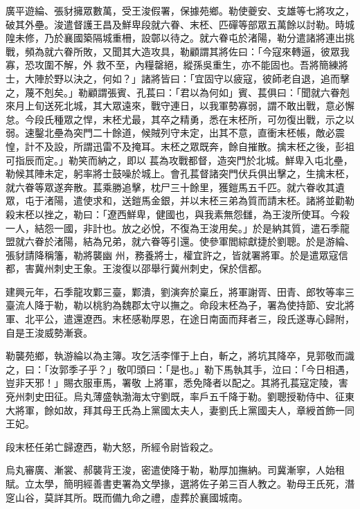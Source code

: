 \begin{pinyinscope}
 廣平遊綸、張豺擁眾數萬，受王浚假署，保據苑鄉。勒使夔安、支雄等七將攻之，破其外壘。浚遣督護王昌及鮮卑段就六眷、末柸、匹磾等部眾五萬餘以討勒。時城隍未修，乃於襄國築隔城重柵，設鄣以待之。就六眷屯於渚陽，勒分遣諸將連出挑戰，頻為就六眷所敗，又聞其大造攻具，勒顧謂其將佐曰：「今寇來轉逼，彼眾我寡，恐攻圍不解，外
 救不至，內糧罄絕，縱孫吳重生，亦不能固也。吾將簡練將士，大陣於野以決之，何如？」諸將皆曰：「宜固守以疲寇，彼師老自退，追而擊之，蔑不剋矣。」勒顧謂張賓、孔萇曰：「君以為何如」賓、萇俱曰：「聞就六眷剋來月上旬送死北城，其大眾遠來，戰守連日，以我軍勢寡弱，謂不敢出戰，意必懈怠。今段氏種眾之悍，末柸尤最，其卒之精勇，悉在末柸所，可勿復出戰，示之以弱。速鑿北壘為突門二十餘道，候賊列守未定，出其不意，直衝末柸帳，敵必震惶，計不及設，所謂迅雷不及掩耳。末柸之眾既奔，餘自摧散。擒末柸之後，彭祖可指辰而定。」勒笑而納之，即以
 萇為攻戰都督，造突門於北城。鮮卑入屯北壘，勒候其陣未定，躬率將士鼓噪於城上。會孔萇督諸突門伏兵俱出擊之，生擒末柸，就六眷等眾遂奔散。萇乘勝追擊，枕尸三十餘里，獲鎧馬五千匹。就六眷收其遺眾，屯于渚陽，遣使求和，送鎧馬金銀，并以末柸三弟為質而請末柸。諸將並勸勒殺末柸以挫之，勒曰：「遼西鮮卑，健國也，與我素無怨讎，為王浚所使耳。今殺一人，結怨一國，非計也。放之必悅，不復為王浚用矣。」於是納其質，遣石季龍盟就六眷於渚陽，結為兄弟，就六眷等引還。使參軍閻綜獻捷於劉聰。於是游綸、張豺請降稱籓，勒將襲幽
 州，務養將士，權宜許之，皆就署將軍。於是遣眾寇信都，害冀州刺史王象。王浚復以邵舉行冀州刺史，保於信都。



 建興元年，石季龍攻鄴三臺，鄴潰，劉演奔於稟丘，將軍謝胥、田青、郎牧等率三臺流人降于勒，勒以桃豹為魏郡太守以撫之。命段末柸為子，署為使持節、安北將軍、北平公，遣還遼西。末柸感勒厚恩，在途日南面而拜者三，段氏遂專心歸附，自是王浚威勢漸衰。



 勒襲苑鄉，執游綸以為主簿。攻乞活李惲于上白，斬之，將坑其降卒，見郭敬而識之，曰：「汝郭季子乎？」敬叩頭曰：「是也。」勒下馬執其手，泣曰：「今日相遇，豈非天邪！」賜衣服車馬，署敬
 上將軍，悉免降者以配之。其將孔萇寇定陵，害兗州刺史田征。烏丸薄盛執渤海太守劉既，率戶五千降于勒。劉聰授勒侍中、征東大將軍，餘如故，拜其母王氏為上黨國太夫人，妻劉氏上黨國夫人，章綬首飾一同王妃。



 段末柸任弟亡歸遼西，勒大怒，所經令尉皆殺之。



 烏丸審廣、漸裳、郝襲背王浚，密遣使降于勒，勒厚加撫納。司冀漸寧，人始租賦。立太學，簡明經善書吏署為文學掾，選將佐子弟三百人教之。勒母王氏死，潛窆山谷，莫詳其所。既而備九命之禮，虛葬於襄國城南。




\end{pinyinscope}
